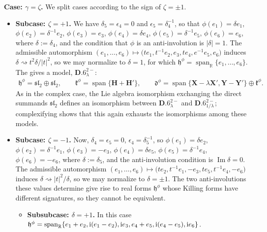 \documentclass[pdftex]{sigma}
\newlength{\caseIndent}
\DeclareMathOperator{\spanOperator}{span}
\renewcommand{\Im}{\operatorname{Im}}
\newcommand{\Span}[1]{\spanOperator\{{#1}\}}
\newcommand{\bbR}{\mathbb{R}}
\newcommand{\mbH}{\mathbf{H}}
\newcommand{\mbX}{\mathbf{X}}
\newcommand{\mbY}{\mathbf{Y}}
\newcommand{\mfd} {\mathfrak{d}}
\newcommand{\mfh} {\mathfrak{h}}
\newcommand{\mfk} {\mathfrak{k}}
\newcommand{\mfsl} {\mathfrak{sl}}
\numberwithin{equation}{section}
\begin{document}
\noindent \textbf{Case: $\gamma = \zeta$.} We split cases according to the sign of $\zeta = \pm 1$.
\begin{itemize}[leftmargin=\caseIndent]\itemsep=0pt
	\item[] \textbf{Subcase: $\zeta = +1$.} We have $\delta_5 = \epsilon_4 = 0$ and $\epsilon_5 = \delta_4^{-1}$, so that $\phi(e_1) = \delta e_1$, $\phi(e_2) = \delta^{-1} e_2$, $\phi(e_3) = e_3$, $\phi(e_4) = \delta e_4$, $\phi(e_5) = \delta^{-1} e_5$, $\phi(e_6) = e_6$, where $\delta := \delta_4$, and the condition that $\phi$ is an anti-involution is $|\delta| = 1$. The admissible automorphism $(e_1, \ldots, e_6) \mapsto \big(t e_1, t^{-1} e_2, e_3, t e_4, e^{-1} e_5, e_6\big)$ induces $\delta \rightsquigarrow t^2 \delta / |t|^2$, so we may normalize to $\delta = 1$, for which $\mfh^{\phi} = \spanOperator_{\bbR}\{e_1, \ldots, e_6\}$. The gives a model, $\mathbf{D.6}_{\lambda}^{2-}$:
	\begin{gather*}
		\boxed{
			\mfh^{\phi} = \mfsl_2 \oplus \mfsl_2, \qquad
			\mfk^{\phi} = \Span{\mbH + \mbH'} , \qquad
			\mfd^{\phi} = \Span{\mbX - \lambda \mbX', \mbY - \mbY'} \oplus \mfk^{\phi} .
		}
	\end{gather*}
	As in the complex case, the Lie algebra isomorphism exchanging the direct summands $\mfsl_2$ defines an isomorphism between $\mathbf{D.6}_{\lambda}^{2-}$ and $\mathbf{D.6}_{1 / \lambda}^{2-}$; complexifying shows that this again exhausts the isomorphisms among these models.
	\item[] \textbf{Subcase: $\zeta = -1$.} Now, $\delta_4 = \epsilon_5 = 0$, $\epsilon_4 = \delta_5^{-1}$, so $\phi(e_1) = \delta e_2$, $\phi(e_2) = \delta^{-1} e_1$, $\phi(e_3) = -e_3$, $\phi(e_4) = \delta e_5$, $\phi(e_5) = \delta^{-1} e_4$, $\phi(e_6) = -e_6$, where $\delta := \delta_5$, and the anti-involution condition is $\Im \delta = 0$. The admissible automorphism $(e_1, \ldots, e_6) \mapsto \big(t e_2, t^{-1} e_1, -e_3, t e_5, t^{-1} e_4, -e_6\big)$ induces $\delta \rightsquigarrow |t|^2 / \delta$, so we may normalize to $\delta = \pm 1$. The two anti-involutions these values determine give rise to real forms $\mfh^{\phi}$ whose Killing forms have different signatures, so they cannot be equivalent.
\begin{itemize}[leftmargin=\caseIndent]\itemsep=0pt
	\item[] \textbf{Subsubcase: $\delta = +1$.} In this case $\mfh^{\phi} = \spanOperator_{\bbR}\{e_1 + e_2, {\rm i} (e_1 - e_2), {\rm i} e_3, e_4 + e_5, {\rm i} (e_4 - e_5), {\rm i} e_6\}$.
		\begin{itemize}[leftmargin=\caseIndent]\itemsep=0pt

\end{itemize}
\end{itemize}
\end{itemize}
\end{document}
